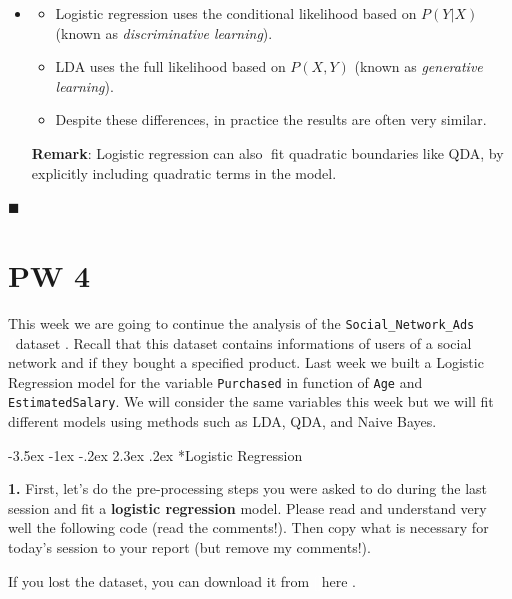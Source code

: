 \documentclass[]{book}
\makeatletter
\providecommand{\tightlist}{%
  \setlength{\itemsep}{0pt}\setlength{\parskip}{0pt}}
\newenvironment{rmdblock}[1]
  {\begin{shaded*}
  \begin{itemize}
  \renewcommand{\labelitemi}{
    \raisebox{-.7\height}[0pt][0pt]{
      {\setkeys{Gin}{width=2em,keepaspectratio}\texttt{[image: img/icons/\#1]}}
    }
  }
  \item
  }
  {
  \end{itemize}
  \end{shaded*}
  }
\newenvironment{rmdinsight}
  {\begin{rmdblock}{insight}}
  {\end{rmdblock}}
\renewcommand\section{\@startsection {section}{1}{\z@}%
                                   {-3.5ex \@plus -1ex \@minus -.2ex}%
                                   {2.3ex \@plus.2ex}%
                                   {\normalfont\Large\bfseries\color{ForestGreen}}}
\theoremstyle{definition}
\theoremstyle{definition}
\theoremstyle{definition}
\theoremstyle{remark}
\makeatother
\begin{document}
\begin{rmdinsight}
\begin{itemize}
\tightlist
\item
  Logistic regression uses the conditional likelihood based on
  \(P(Y|X)\) (known as \emph{discriminative learning}).
\item
  LDA uses the full likelihood based on \(P(X,Y )\) (known as
  \emph{generative learning}).
\item
  Despite these differences, in practice the results are often very
  similar.
\end{itemize}

\textbf{Remark}: Logistic regression can also fit quadratic boundaries
like QDA, by explicitly including quadratic terms in the model.
\end{rmdinsight}

◼

\chapter*{PW 4}\label{pw-4}

This week we are going to continue the analysis of the
\texttt{Social\_Network\_Ads}
\textcolor{white}{[}\faTable\textcolor{white}{]}dataset . Recall that
this dataset contains informations of users of a social network and if
they bought a specified product. Last week we built a Logistic
Regression model for the variable \texttt{Purchased} in function of
\texttt{Age} and \texttt{EstimatedSalary}. We will consider the same
variables this week but we will fit different models using methods such
as LDA, QDA, and Naive Bayes.

\section*{Logistic Regression}\label{logistic-regression-2}

\textbf{1.} First, let's do the pre-processing steps you were asked to
do during the last session and fit a \textbf{logistic regression} model.
Please read and understand very well the following code (read the
comments!). Then copy what is necessary for today's session to your
report (but remove my comments!).

If you lost the dataset, you can download it from
\textcolor{white}{[}\faTable\textcolor{white}{]}here .
\end{document}
